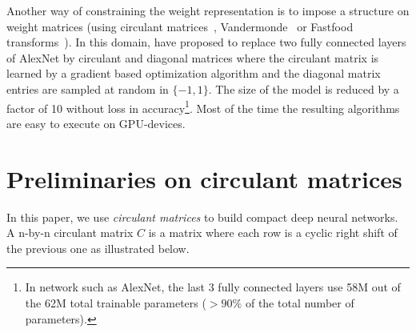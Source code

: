Another way of constraining the weight representation is to impose a structure on weight matrices (\eg using circulant matrices~\cite{cheng,NIPS2015_5869}, Vandermonde~\cite{NIPS2015_5869} or Fastfood transforms~\cite{7410530}).
In this domain, \citet{cheng} have proposed to replace two fully connected layers of AlexNet by circulant and diagonal matrices where the circulant matrix is learned by a gradient based optimization algorithm and the diagonal matrix entries are sampled at random in $\{-1, 1\}$. 
The size of the model is reduced by a factor of 10 without loss in accuracy\footnote{In network such as AlexNet, the last 3 fully connected layers use 58M out of the 62M total trainable parameters ($> 90\%$ of the total number of parameters).}.
Most of the time the resulting algorithms are easy to execute on GPU-devices. 

\section{Preliminaries on circulant matrices}
\label{section:ap2-circ}

In this paper, we use \emph{circulant matrices} to build compact deep neural networks.
A n-by-n circulant matrix $C$ is a matrix where each row is a cyclic right shift of the previous one as illustrated below.



